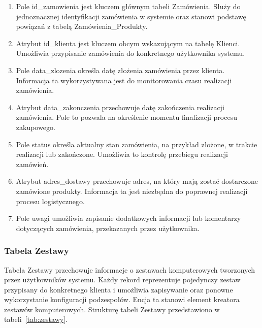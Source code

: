 \documentclass[a4paper,twoside,12pt]{book}
\begin{document}
\begin{enumerate}
    \item Pole id\_zamowienia jest kluczem głównym tabeli Zamówienia. Służy do
    jednoznacznej identyfikacji zamówienia w systemie oraz stanowi podstawę
    powiązań z tabelą Zamówienia\_Produkty.

    \item Atrybut id\_klienta jest kluczem obcym wskazującym na tabelę Klienci.
    Umożliwia przypisanie zamówienia do konkretnego użytkownika systemu.

    \item Pole data\_zlozenia określa datę złożenia zamówienia przez klienta.
    Informacja ta wykorzystywana jest do monitorowania czasu realizacji
    zamówienia.

    \item Atrybut data\_zakonczenia przechowuje datę zakończenia realizacji
    zamówienia. Pole to pozwala na określenie momentu finalizacji procesu
    zakupowego.

    \item Pole status określa aktualny stan zamówienia, na przykład złożone,
    w trakcie realizacji lub zakończone. Umożliwia to kontrolę przebiegu
    realizacji zamówień.

    \item Atrybut adres\_dostawy przechowuje adres, na który mają zostać
    dostarczone zamówione produkty. Informacja ta jest niezbędna do poprawnej
    realizacji procesu logistycznego.

    \item Pole uwagi umożliwia zapisanie dodatkowych informacji lub komentarzy
    dotyczących zamówienia, przekazanych przez użytkownika.
\end{enumerate}
\newpage 
\subsubsection{Tabela Zestawy}
Tabela Zestawy przechowuje informacje o zestawach komputerowych tworzonych przez
użytkowników systemu. Każdy rekord reprezentuje pojedynczy zestaw przypisany do
konkretnego klienta i umożliwia zapisywanie oraz ponowne wykorzystanie
konfiguracji podzespołów. Encja ta stanowi element kreatora zestawów
komputerowych. Strukturę tabeli Zestawy przedstawiono w tabeli~\ref{tab:zestawy}.
\end{document}
